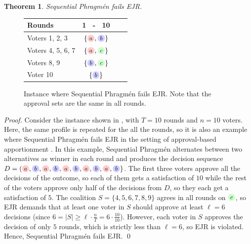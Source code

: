 \documentclass[10pt]{scrartcl}
\theoremstyle{plain}
\newtheorem{theorem}{Theorem}[section]
\theoremstyle{definition}
\renewcommand*{\ge}{\geqslant}
\newcommand{\alternativea}{\tikz[baseline=-3pt,transform shape,scale=0.85]{\node[text height=6pt,inner sep=1pt,fill=red!20,    circle,minimum width=12pt] (x) {$a$};}}
\newcommand{\alternativeb}{\tikz[baseline=-3pt,transform shape,scale=0.85]{\node[text height=6pt,inner sep=1pt,fill=blue!20,   circle,minimum width=12pt] (x) {$b$};}}
\newcommand{\alternativec}{\tikz[baseline=-3pt,transform shape,scale=0.85]{\node[text height=6pt,inner sep=1pt,fill=green!20,  circle,minimum width=12pt] (x) {$c$};}}
\begin{document}
\begin{theorem}
    Sequential Phragm\'en fails EJR.
\label{thm:phragmen_fails_EJR}
\end{theorem}

\begin{figure}
	\vspace{-12pt}	
	\centering
	\scalebox{0.94}
	{\setlength{\tabcolsep}{4pt}
		\begin{tabular}{lccc}
			\toprule
			Rounds & 1 \ - \ 10 \\
			\midrule
			Voters 1, 2, 3 & $\{\alternativea, \alternativeb\}$ \\
			Voters 4, 5, 6, 7  & $\{\alternativea, \alternativec\}$  \\
			Voters 8, 9  & $\{\alternativeb, \alternativec\}$ \\
			Voter 10 & $\{\alternativeb\}$  \\
			\bottomrule
	\end{tabular}}
	\caption{Instance where Sequential Phragm\'en fails EJR. Note that the approval sets are the same in all rounds.}
	\label{fig:phragmen_fails_EJR_simpler_example}
\end{figure}

\noindent
\emph{Proof.}\: Consider the instance shown in , with $T = 10$ rounds and $n = 10$ voters. Here, the same profile is repeated for the all the rounds, so it is also an example where Sequential Phragm\'en fails EJR in the setting of approval-based apportionment \citep{approvalbasedapportionment}. In this example, Sequential Phragm\'en alternates between two alternatives as winner in each round and produces the decision sequence $D = (\alternativea, \alternativeb, \alternativea,\alternativeb, \alternativea, \alternativeb, \alternativea, \alternativeb, \alternativea, \alternativeb\} $. The first three voters approve all the decisions of the outcome, so each of them gets a satisfaction of $10$ while the rest of the voters approve only half of the decisions from $D$, so they each get a satisfaction of $5$.  The coalition $S = \{4, 5, 6, 7, 8, 9\}$ agrees in all rounds on $\alternativec$, so EJR demands that at least one voter in $S$ should approve at least $\ell = 6$ decisions (since $6 = |S| \ge \ell \cdot \frac{n}{T} = 6 \cdot \frac{10}{10}$). However, each voter in $S$ approves the decision of only $5$ rounds, which is strictly less than $\ell = 6$, so EJR is violated. Hence, Sequential Phragm\'en fails EJR. \hfill\qed
\end{document}

